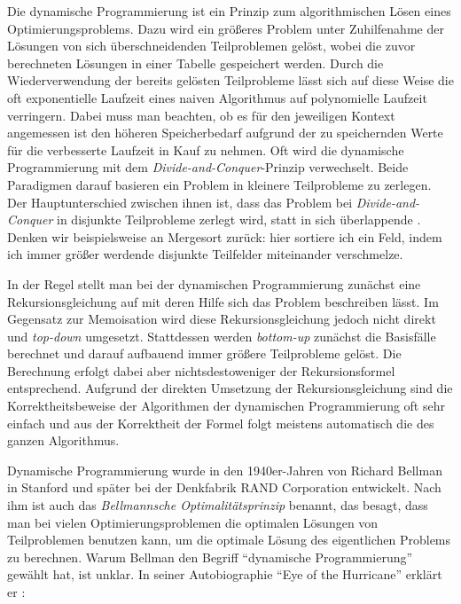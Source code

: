 Die dynamische Programmierung ist ein Prinzip zum algorithmischen Lösen eines Optimierungsproblems. Dazu wird ein größeres Problem unter Zuhilfenahme der Lösungen von sich überschneidenden Teilproblemen gelöst, wobei die zuvor berechneten Lösungen in einer Tabelle gespeichert werden. Durch die Wiederverwendung der bereits gelösten Teilprobleme lässt sich auf diese Weise die oft exponentielle Laufzeit eines naiven Algorithmus auf polynomielle Laufzeit verringern. Dabei muss man beachten, ob es für den jeweiligen Kontext angemessen ist den höheren Speicherbedarf aufgrund der zu speichernden Werte für die verbesserte Laufzeit in Kauf zu nehmen. Oft wird die dynamische Programmierung mit dem \emph{Divide-and-Conquer}-Prinzip verwechselt. Beide Paradigmen darauf basieren ein Problem in kleinere Teilprobleme zu zerlegen. Der Hauptunterschied zwischen ihnen ist, dass das Problem bei \emph{Divide-and-Conquer} in disjunkte Teilprobleme zerlegt wird, statt in sich überlappende \cite{clrs09}. Denken wir beispielsweise an Mergesort zurück: hier sortiere ich ein Feld, indem ich immer größer werdende disjunkte Teilfelder miteinander verschmelze.

In der Regel stellt man bei der dynamischen Programmierung zunächst eine Rekursionsgleichung auf mit deren Hilfe sich das Problem beschreiben lässt. Im Gegensatz zur Memoisation wird diese Rekursionsgleichung jedoch nicht direkt und \emph{top-down} umgesetzt. Stattdessen werden \emph{bottom-up} zunächst die Basisfälle berechnet und darauf aufbauend immer größere Teilprobleme gelöst. Die Berechnung erfolgt dabei aber nichtsdestoweniger der Rekursionsformel entsprechend. Aufgrund der direkten Umsetzung der Rekursionsgleichung sind die Korrektheitsbeweise der Algorithmen der dynamischen Programmierung oft sehr einfach und aus der Korrektheit der Formel folgt meistens automatisch die des ganzen Algorithmus.

Dynamische Programmierung wurde in den 1940er-Jahren von Richard Bellman in Stanford und später bei der Denkfabrik RAND Corporation entwickelt. Nach ihm ist auch das \emph{Bellmannsche Optimalitätsprinzip} benannt, das besagt, dass man bei vielen Optimierungsproblemen die optimalen Lösungen von Teilproblemen benutzen kann, um die optimale Lösung des eigentlichen Problems zu berechnen. Warum Bellman den Begriff \enquote{dynamische Programmierung} gewählt hat, ist unklar. In seiner Autobiographie \enquote{Eye of the Hurricane} erklärt er \cite{b84}:

